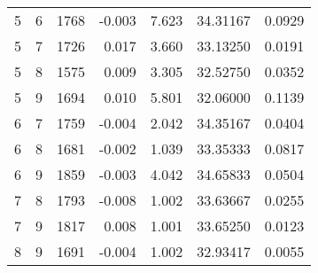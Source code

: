 \begin{longtable}{rrrrrrr}
5 & 6 & 1768 & -0.003 & 7.623 & 34.31167 & 0.0929 \\ 
5 & 7 & 1726 & 0.017 & 3.660 & 33.13250 & 0.0191 \\ 
5 & 8 & 1575 & 0.009 & 3.305 & 32.52750 & 0.0352 \\ 
5 & 9 & 1694 & 0.010 & 5.801 & 32.06000 & 0.1139 \\ 
6 & 7 & 1759 & -0.004 & 2.042 & 34.35167 & 0.0404 \\ 
6 & 8 & 1681 & -0.002 & 1.039 & 33.35333 & 0.0817 \\ 
6 & 9 & 1859 & -0.003 & 4.042 & 34.65833 & 0.0504 \\ 
7 & 8 & 1793 & -0.008 & 1.002 & 33.63667 & 0.0255 \\ 
7 & 9 & 1817 & 0.008 & 1.001 & 33.65250 & 0.0123 \\ 
8 & 9 & 1691 & -0.004 & 1.002 & 32.93417 & 0.0055 \\ 
\bottomrule
\end{longtable}

